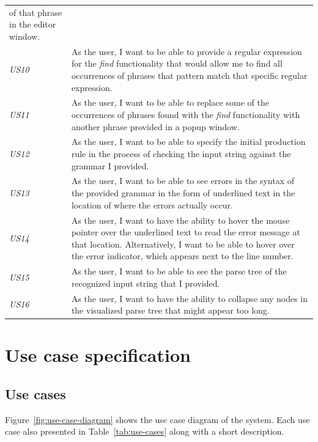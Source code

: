 \documentclass[english,bachelors,forcepolishlogotype]{wizthesis}
\begin{document}
\begin{xltabular}{\textwidth}{@{}lX@{}}
  of that phrase in the editor window. \\
  \addlinespace[0.5em] \emph{US10} & As the user, I want to be able to provide a
  regular expression for the \emph{find} functionality that would allow me to
  find all occurrences of phrases that pattern match that specific regular
  expression. \\
  \addlinespace[0.5em] \emph{US11} & As the user, I want to be able to replace
  some of the occurrences of phrases found with the \emph{find} functionality
  with another phrase provided in a popup window. \\
  \addlinespace[0.5em] \emph{US12} & As the user, I want to be able to specify
  the initial production rule in the process of checking the input string
  against the grammar I provided. \\
  \addlinespace[0.5em] \emph{US13} & As the user, I want to be able to see
  errors in the syntax of the provided grammar in the form of underlined text in
  the location of where the errors actually occur. \\
  \addlinespace[0.5em] \emph{US14} & As the user, I want to have the ability to
  hover the mouse pointer over the underlined text to read the error message at
  that location. Alternatively, I want to be able to hover over the error
  indicator, which appears next to the line number. \\
  \addlinespace[0.5em] \emph{US15} & As the user, I want to be able to see the
  parse tree of the recognized input string that I provided. \\
  \addlinespace[0.5em] \emph{US16} & As the user, I want to have the ability to
  collapse any nodes in the visualized parse tree that might appear too long.
  \\* \bottomrule
\end{xltabular}

\section{Use case specification} \label{sec:use-case-specification}

\subsection{Use cases} \label{sbs:use-cases}

Figure~\ref{fig:use-case-diagram} shows the use case diagram of the system. Each
use case also presented in Table~\ref{tab:use-cases} along with a short
description.
\end{document}
